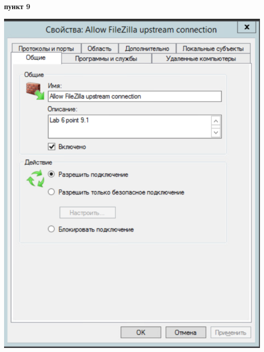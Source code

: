 \documentclass[a4paper,14pt]{extarticle}
\begin{document}
    \newpage
    \textbf{пункт 9}
    \begin{center}
        \includegraphics[scale=0.7]{9.1.1.png}
    \end{center}
\end{document}
